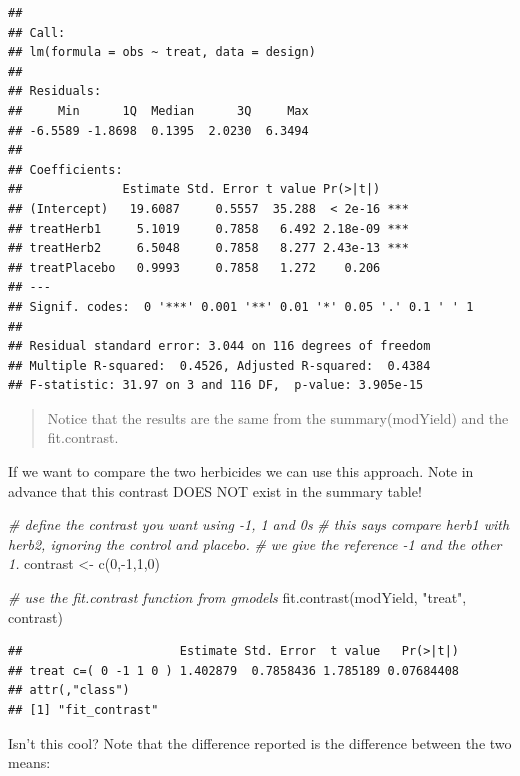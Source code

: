 \documentclass[
]{book}
\newenvironment{Shaded}{\begin{snugshade}}{\end{snugshade}}
\newcommand{\CommentTok}[1]{\textcolor[rgb]{0.56,0.35,0.01}{\textit{#1}}}
\newcommand{\DecValTok}[1]{\textcolor[rgb]{0.00,0.00,0.81}{#1}}
\newcommand{\FunctionTok}[1]{\textcolor[rgb]{0.00,0.00,0.00}{#1}}
\newcommand{\NormalTok}[1]{#1}
\newcommand{\OtherTok}[1]{\textcolor[rgb]{0.56,0.35,0.01}{#1}}
\newcommand{\SpecialCharTok}[1]{\textcolor[rgb]{0.00,0.00,0.00}{#1}}
\newcommand{\StringTok}[1]{\textcolor[rgb]{0.31,0.60,0.02}{#1}}
\begin{document}
\begin{verbatim}
## 
## Call:
## lm(formula = obs ~ treat, data = design)
## 
## Residuals:
##     Min      1Q  Median      3Q     Max 
## -6.5589 -1.8698  0.1395  2.0230  6.3494 
## 
## Coefficients:
##              Estimate Std. Error t value Pr(>|t|)    
## (Intercept)   19.6087     0.5557  35.288  < 2e-16 ***
## treatHerb1     5.1019     0.7858   6.492 2.18e-09 ***
## treatHerb2     6.5048     0.7858   8.277 2.43e-13 ***
## treatPlacebo   0.9993     0.7858   1.272    0.206    
## ---
## Signif. codes:  0 '***' 0.001 '**' 0.01 '*' 0.05 '.' 0.1 ' ' 1
## 
## Residual standard error: 3.044 on 116 degrees of freedom
## Multiple R-squared:  0.4526, Adjusted R-squared:  0.4384 
## F-statistic: 31.97 on 3 and 116 DF,  p-value: 3.905e-15
\end{verbatim}

\begin{quote}
Notice that the results are the same from the summary(modYield) and the fit.contrast.
\end{quote}

If we want to compare the two herbicides we can use this approach. Note in advance that this contrast DOES NOT exist in the summary table!

\begin{Shaded}
\begin{Highlighting}[]
\CommentTok{\# define the contrast you want using {-}1, 1 and 0\textquotesingle{}s}
\CommentTok{\# this says compare herb1 with herb2, ignoring the control and placebo.}
\CommentTok{\# we give the reference {-}1 and the \textquotesingle{}other\textquotesingle{} 1.}
\NormalTok{contrast }\OtherTok{\textless{}{-}} \FunctionTok{c}\NormalTok{(}\DecValTok{0}\NormalTok{,}\SpecialCharTok{{-}}\DecValTok{1}\NormalTok{,}\DecValTok{1}\NormalTok{,}\DecValTok{0}\NormalTok{)}

\CommentTok{\# use the fit.contrast function from gmodels}
\FunctionTok{fit.contrast}\NormalTok{(modYield, }\StringTok{"treat"}\NormalTok{, contrast)}
\end{Highlighting}
\end{Shaded}

\begin{verbatim}
##                      Estimate Std. Error  t value   Pr(>|t|)
## treat c=( 0 -1 1 0 ) 1.402879  0.7858436 1.785189 0.07684408
## attr(,"class")
## [1] "fit_contrast"
\end{verbatim}

Isn't this cool? Note that the difference reported is the difference between the two means:
\end{document}

